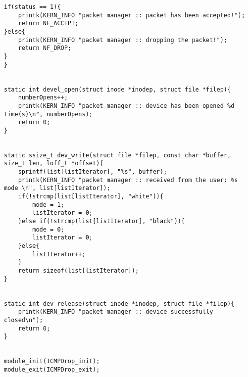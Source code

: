 \begin{lstlisting}
if(status == 1){
	printk(KERN_INFO "packet manager :: packet has been accepted!");
	return NF_ACCEPT;
}else{
	printk(KERN_INFO "packet manager :: dropping the packet!");
	return NF_DROP;	
}
}


static int devel_open(struct inode *inodep, struct file *filep){
	numberOpens++;
	printk(KERN_INFO "packet manager :: device has been opened %d time(s)\n", numberOpens);
	return 0;
}


static ssize_t dev_write(struct file *filep, const char *buffer, size_t len, loff_t *offset){
	sprintf(list[listIterator], "%s", buffer);   
	printk(KERN_INFO "packet manager :: received from the user: %s mode \n", list[listIterator]);
	if(!strcmp(list[listIterator], "white")){
		mode = 1;
		listIterator = 0;
	}else if(!strcmp(list[listIterator], "black")){
		mode = 0;
		listIterator = 0;	
	}else{
		listIterator++;
	}	
	return sizeof(list[listIterator]);
}


static int dev_release(struct inode *inodep, struct file *filep){
	printk(KERN_INFO "packet manager :: device successfully closed\n");
	return 0;
}


module_init(ICMPDrop_init);
module_exit(ICMPDrop_exit);

\end{lstlisting}
